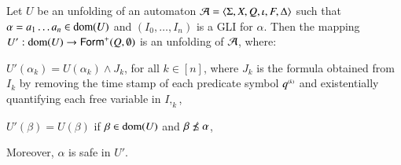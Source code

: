 \begin{lemma}\label{lemma:refinement}
  Let $U$ be an unfolding of an automaton $\mathcal{A} =
  \langle \Sigma,X,Q,\iota,F,\Delta \rangle$ such that $\alpha = a_1\ldots a_n
  \in \mathrm{dom}(U)$ and $(I_0, \ldots, I_n)$ is a GLI for $\alpha$. Then
  the mapping $U' : \mathrm{dom}(U) \rightarrow \mathsf{Form}^+(Q,\emptyset)$ is an
  unfolding of $\mathcal{A}$, where:
  \begin{compactitem}
  \item $U'(\alpha_k) = U(\alpha_k) \wedge J_k$, for all $k \in [n]$,
    where $J_k$ is the formula obtained from $I_k$ by removing the
    time stamp of each predicate symbol ${q}^{\scriptscriptstyle{({k})}}$ and
    existentially quantifying each free variable in $I, _k$,
\item $U'(\beta) = U(\beta)$ if $\beta \in \mathrm{dom}(U)$ and $\beta
  \not\prefix \alpha$,
  \end{compactitem}
  Moreover, $\alpha$ is safe in $U'$.
\end{lemma}
